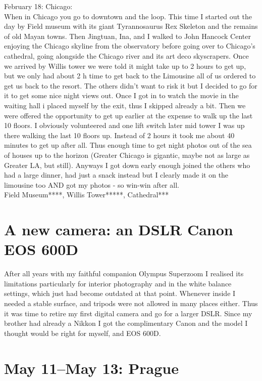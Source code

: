 February 18: Chicago:\\
When in Chicago you go to downtown and the loop. This time I started out the day by Field museum with its giant Tyrannosaurus Rex Skeleton and the remains of old Mayan towns. Then Jingtuan, Ina, and I walked to John Hancock Center enjoying the Chicago skyline from the observatory before going over to Chicago's cathedral, going alongside the Chicago river and its art deco skyscrapers. Once we arrived by Willis tower we were told it might take up to 2 hours to get up, but we only had about 2 h time to get back to the Limousine all of us ordered to get us back to the resort. The others didn't want to risk it but I decided to go for it to get some nice night views out. Once I got in to watch the movie in the waiting hall i placed myself by the exit, thus I skipped already a bit. Then we were offered the opportunity to get up earlier at the expense to walk up the last 10 floors. I obviously volunteered and one lift switch later mid tower I was up there walking the last 10 floors up. Instead of 2 hours it took me about 40 minutes to get up after all. Thus enough time to get night photos out of the sea of houses up to the horizon (Greater Chicago is gigantic, maybe not as large as Greater LA, but still). Anyways I got down early enough joined the others who had a large dinner, had just a snack instead but I clearly made it on the limousine too AND got my photos - so win-win after all.\\

Field Museum****, Willis Tower*****, Cathedral***

\section{A new camera: an DSLR Canon EOS 600D}
\label{canon600D}

After all years with my faithful companion Olympus Superzoom I realised its limitations particularly for interior photography and in the white balance settings, which just had become outdated at that point. Whenever inside I needed a stable surface, and tripods were not allowed in many places either. Thus it was time to retire my first digital camera and go for a larger DSLR. Since my brother had already a Nikkon I got the complimentary Canon and the model I thought would be right for myself, and EOS 600D.

\section{May 11--May 13: Prague}
\label{2012Prag}

